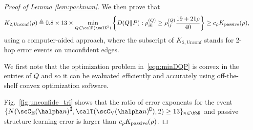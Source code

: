 \documentclass[11pt,onecolumn]{article}
\newcommand{\Passive}{{\rm passive}}
\begin{document}
\begin{proof}[Proof of Lemma \ref{lem:packnum}]
	We then prove that
	\begin{align}
    	K_{2,\mathrm{Unconf}}(\rho)\triangleq 0.8\times13\times\min_{Q\in\calP(\calX^{3})}\bigg\{D(Q\|P):\rho_{ik}^{(Q)}\geq\rho_{ij}^{(Q)}\frac{19+21\rho}{40}\bigg\}\geq c_{\rho}K _{\Passive}(\rho), \label{eqn:minDQP}
	\end{align}
	using a computer-aided approach, where the subscript of $K_{2,\mathrm{Unconf}}$ stands for 2-hop error events on unconfident edges.
	
	We first note that the optimization problem in~\eqref{eqn:minDQP} is  convex in the entries of $Q$ and so it can be evaluated efficiently and accurately using off-the-shelf convex optimization software. %
	
	Fig.~\ref{fig:unconfide_tri} shows that the ratio of error exponents for the event $\{N(\scC_{\mathrm{E}}(\halpha n)^{\complement},\calT(\scC_{\mathrm{V}}(\halpha n)^{\complement}),2)\geq 13\}_{n\in\bbN}$ and passive structure learning error is larger than $c_{\rho}K _{\Passive}(\rho)$.
\end{proof}
\end{document}
